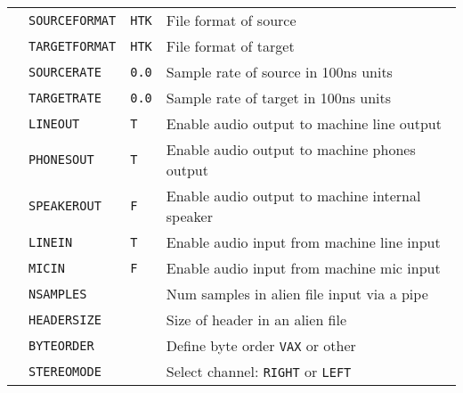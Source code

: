 \begin{center}
\tabletail{\hline}
\begin{supertabular}{|p{1.4cm}|l|l|p{6.6cm}|}

 & \texttt{SOURCEFORMAT} & \texttt{HTK}
  & File format of source \\ 
 & \texttt{TARGETFORMAT} & \texttt{HTK} & File format of target \\ \hline

    
  & \texttt{SOURCERATE} & \texttt{0.0} & Sample rate of source in 100ns units \\ \hline

  
  & \texttt{TARGETRATE} & \texttt{0.0} & Sample rate of target in 100ns units \\ \hline

  & \texttt{LINEOUT} & \texttt{T}   & Enable audio output to machine line output \\ 
  & \texttt{PHONESOUT} & \texttt{T} & Enable audio output to machine phones output \\ 
  & \texttt{SPEAKEROUT} & \texttt{F}& Enable audio output to machine internal speaker \\ 
  & \texttt{LINEIN} & \texttt{T} & Enable audio input from machine line input \\ 
  & \texttt{MICIN}  & \texttt{F} & Enable audio input from machine mic input \\ \hline

  & \texttt{NSAMPLES} &  & Num samples in alien file input via a pipe\\ 
 & \texttt{HEADERSIZE}  &   & Size of header in an alien file\\ 
  & \texttt{BYTEORDER} &   & Define byte order \texttt{VAX} or other\\ 
  & \texttt{STEREOMODE} &   & Select channel: \texttt{RIGHT} or \texttt{LEFT} \\ \hline


\end{supertabular}
\end{center}

